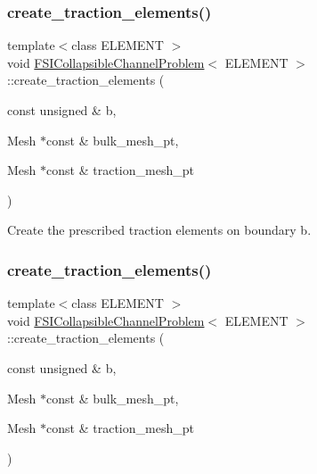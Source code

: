 \subsubsection{\texorpdfstring{create\+\_\+traction\+\_\+elements()}{create\_traction\_elements()}\hspace{0.1cm}{\footnotesize\ttfamily [2/4]}}
{\footnotesize\ttfamily template$<$class E\+L\+E\+M\+E\+NT $>$ \\
void \hyperlink{classFSICollapsibleChannelProblem}{F\+S\+I\+Collapsible\+Channel\+Problem}$<$ E\+L\+E\+M\+E\+NT $>$\+::create\+\_\+traction\+\_\+elements (\begin{DoxyParamCaption}\item[{const unsigned \&}]{b,  }\item[{Mesh $\ast$const \&}]{bulk\+\_\+mesh\+\_\+pt,  }\item[{Mesh $\ast$const \&}]{traction\+\_\+mesh\+\_\+pt }\end{DoxyParamCaption})\hspace{0.3cm}{\ttfamily [private]}}



Create the prescribed traction elements on boundary b. 

\mbox{\label{classFSICollapsibleChannelProblem_af7352e5fd5ea8965adbc9505749442a3}} 
\subsubsection{\texorpdfstring{create\+\_\+traction\+\_\+elements()}{create\_traction\_elements()}\hspace{0.1cm}{\footnotesize\ttfamily [3/4]}}
{\footnotesize\ttfamily template$<$class E\+L\+E\+M\+E\+NT $>$ \\
void \hyperlink{classFSICollapsibleChannelProblem}{F\+S\+I\+Collapsible\+Channel\+Problem}$<$ E\+L\+E\+M\+E\+NT $>$\+::create\+\_\+traction\+\_\+elements (\begin{DoxyParamCaption}\item[{const unsigned \&}]{b,  }\item[{Mesh $\ast$const \&}]{bulk\+\_\+mesh\+\_\+pt,  }\item[{Mesh $\ast$const \&}]{traction\+\_\+mesh\+\_\+pt }\end{DoxyParamCaption})\hspace{0.3cm}{\ttfamily [private]}}



